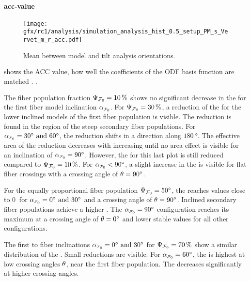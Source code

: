 \paragraph{acc-value}
%
\begin{figure}[!p]
\centering
\texttt{[image: gfx/rc1/analysis/simulation\_analysis\_hist\_0.5\_setup\_PM\_s\_Vervet\_m\_r\_acc.pdf]}
\caption{Mean \accvalue{} between model and tilt analysis orientations.}
\label{fig:sim_ana_acc}
\end{figure}
% 
 shows the  \ac{ACC} value, \ie{} how well the coefficients of the \ac{ODF} basis function are matched \cite{Schilling2018}.
.
\par
% 
The fiber population fraction $\textnormal{$\Psi_{\textnormal{$\mathcal{F}_0$}}$}=\SI{10}{\percent}$ shows no significant decrease in the \accvalue{} for the first fiber model inclination $\modelInc$.
For $\textnormal{$\Psi_{\textnormal{$\mathcal{F}_0$}}$}=\SI{30}{\percent}$, a reduction of the \accvalue{} for the lower inclined models of the first fiber population is visible.
The reduction is found in the region of the steep secondary fiber populations.
For $\modelInc = \SIlist{30;60}{\degree}$, the reduction shifts in a direction along $\SI{180}{\degree}$.
The effective area of the reduction decreases with increasing \modelInc{} until no area effect is visible for an inclination of $\modelInc=\SI{90}{\degree}$.
However, the \accvalue{} for this last plot is still reduced compared to $\textnormal{$\Psi_{\textnormal{$\mathcal{F}_0$}}$}=\SI{10}{\percent}$.
For $\modelInc < \SI{90}{\degree}$, a slight increase in the \accvalue{} is visible for flat fiber crossings with a crossing angle of $\textnormal{$\theta$}=\SI{90}{\degree}$.
\par
%
For the equally proportional fiber population $\textnormal{$\Psi_{\textnormal{$\mathcal{F}_0$}}$} = \SI{50}{\degree}$, the \accvalue{} reaches values close to $\SI{0}{}$ for $\modelInc = \SIlist{0;30}{\degree}$ and a crossing angle of $\textnormal{$\theta$}=\SI{90}{\degree}$.
Inclined secondary fiber populations achieve a higher \accvalue{}.
The $\modelInc = \SI{90}{\degree}$ configuration reaches its maximum \accvalue{} at a crossing angle of $\textnormal{$\theta$}=\SI{0}{\degree}$ and lower stable values for all other configurations.
\par
%
The first to fiber inclinations $\modelInc = \SIlist{0;30}{\degree}$ for $\textnormal{$\Psi_{\textnormal{$\mathcal{F}_0$}}$}=\SI{70}{\percent}$ show a similar distribution of the \accvalue{}. 
Small reductions are visible.
For $\modelInc=\SI{60}{\degree}$, the \accvalue{} is highest at low crossing angles $\textnormal{$\theta$}$, \ie{} near the first fiber population.
The \accvalue{} decreases significantly at higher crossing angles.

